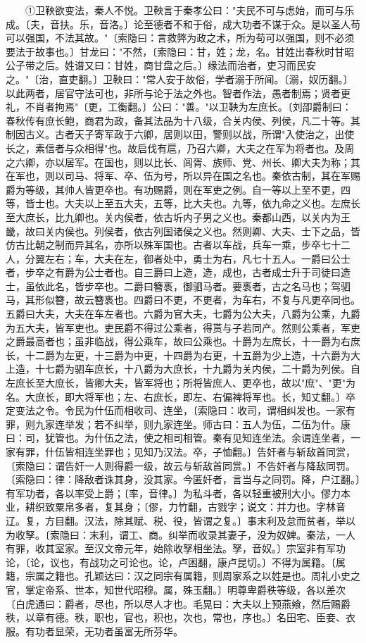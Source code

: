 　　①卫鞅欲变法，秦人不悦。卫鞅言于秦孝公曰："夫民不可与虑始，而可与乐成。〔夫，音扶。乐，音洛。〕论至德者不和于俗，成大功者不谋于众。是以圣人苟可以强国，不法其故。"〔索隐曰：言救弊为政之术，所为苟可以强国，则不必须要法于故事也。〕甘龙曰："不然，〔索隐曰：甘，姓；龙，名。甘姓出春秋时甘昭公子带之后。姓谱又曰：甘姓，商甘盘之后。〕缘法而治者，吏习而民安之。"〔治，直吏翻。〕卫鞅曰："常人安于故俗，学者溺于所闻。〔溺，奴历翻。〕以此两者，居官守法可也，非所与论于法之外也。智者作法，愚者制焉；贤者更礼，不肖者拘焉"〔更，工衡翻。〕公曰："善。"以卫鞅为左庶长。〔刘卲爵制曰：春秋传有庶长鲍，商君为政，备其法品为十八级，合关内侯、列侯，凡二十等。其制因古义。古者天子寄军政于六卿，居则以田，警则以战，所谓"入使治之，出使长之，素信者与众相得"也。故启伐有扈，乃召六卿，大夫之在军为将者也。及周之六卿，亦以居军。在国也，则以比长、闾胥、族师、党、州长、卿大夫为称；其在军也，则以司马、将军、卒、伍为号，所以异在国之名也。秦依古制，其在军赐爵为等级，其帅人皆更卒也。有功赐爵，则在军吏之例。自一等以上至不更，四等，皆士也。大夫以上至五大夫，五等，比大夫也。九等，依九命之义也。左庶长至大庶长，比九卿也。关内侯者，依古圻内子男之义也。秦都山西，以关内为王畿，故曰关内侯也。列侯者，依古列国诸侯之义也。然则卿、大夫、士下之品，皆仿古比朝之制而异其名，亦所以殊军国也。古者以车战，兵车一乘，步卒七十二人，分翼左右；车，大夫在左，御者处中，勇士为右，凡七十五人。一爵曰公士者，步卒之有爵为公士者也。自三爵曰上造，造，成也，古者成士升于司徒曰造士，虽依此名，皆步卒也。二爵曰簪褭，御驷马者。要褭者，古之名马也；驾驷马，其形似簪，故云簪褭也。四爵曰不更，不更者，为车右，不复与凡更卒同也。五爵曰大夫，大夫在车左者也。六爵为官大夫，七爵为公大夫，八爵为公乘，九爵为五大夫，皆军吏也。吏民爵不得过公乘者，得贳与子若同产。然则公乘者，军吏之爵最高者也；虽非临战，得公乘车，故曰公乘也。十爵为左庶长，十一爵为右庶长，十二爵为左更，十三爵为中更，十四爵为右更，十五爵为少上造，十六爵为大上造，十七爵为驷车庶长，十八爵为大庶长，十九爵为关内侯，二十爵为列侯。自左庶长至大庶长，皆卿大夫，皆军将也；所将皆庶人、更卒也，故以"庶"、"更"为名。大庶长，即大将军也；左、右庶长，即左、右偏裨将军也。长，知丈翻。〕卒定变法之令。令民为什伍而相收司、连坐，〔索隐曰：收司，谓相纠发也。一家有罪，则九家连举发；若不纠举，则九家连坐。师古曰：五人为伍，二伍为什。康曰：司，犹管也。为什伍之法，使之相司相管。秦有见知连坐法。余谓连坐者，一家有罪，什伍皆相连坐罪也；见知乃汉法。卒，子恤翻。〕告奸者与斩敌首同赏，〔索隐曰：谓告奸一人则得爵一级，故云与斩敌首同赏。〕不告奸者与降敌同罚。〔索隐曰：律：降敌者诛其身，没其家。今匿奸者，言当与之同罚。降，户江翻。〕有军功者，各以率受上爵；〔率，音律。〕为私斗者，各以轻重被刑大小。僇力本业，耕织致粟帛多者，复其身；〔僇，力竹翻，古戮字；说文：并力也。字林音辽。复，方目翻。汉法，除其赋、税、役，皆谓之复。〕事末利及怠而贫者，举以为收孥。〔索隐曰：末利，谓工、商。纠举而收录其妻子，没为奴婢。秦法，一人有罪，收其室家。至汉文帝元年，始除收孥相坐法。孥，音奴。〕宗室非有军功论，〔论，议也，有战功之可论也。论，卢困翻，康卢昆切。〕不得为属籍。〔属籍，宗属之籍也。孔颖达曰：汉之同宗有属籍，则周家系之以姓是也。周礼小史之官，掌定帝系、世本，知世代昭穆。属，殊玉翻。〕明尊卑爵秩等级，各以差次〔白虎通曰：爵者，尽也，所以尽人才也。毛晃曰：大夫以上预燕飨，然后赐爵秩，以章有德。秩，职也，官也，积也，次也，常也，序也。〕名田宅、臣妾、衣服。有功者显荣，无功者虽富无所芬华。

